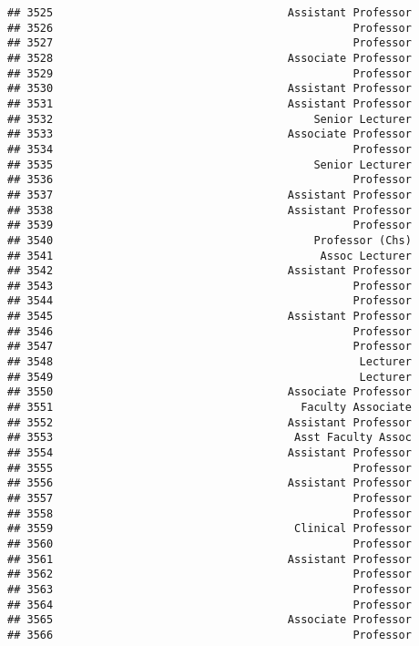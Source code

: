 \documentclass[
]{article}
\begin{document}
\begin{verbatim}
## 3525                                    Assistant Professor
## 3526                                              Professor
## 3527                                              Professor
## 3528                                    Associate Professor
## 3529                                              Professor
## 3530                                    Assistant Professor
## 3531                                    Assistant Professor
## 3532                                        Senior Lecturer
## 3533                                    Associate Professor
## 3534                                              Professor
## 3535                                        Senior Lecturer
## 3536                                              Professor
## 3537                                    Assistant Professor
## 3538                                    Assistant Professor
## 3539                                              Professor
## 3540                                        Professor (Chs)
## 3541                                         Assoc Lecturer
## 3542                                    Assistant Professor
## 3543                                              Professor
## 3544                                              Professor
## 3545                                    Assistant Professor
## 3546                                              Professor
## 3547                                              Professor
## 3548                                               Lecturer
## 3549                                               Lecturer
## 3550                                    Associate Professor
## 3551                                      Faculty Associate
## 3552                                    Assistant Professor
## 3553                                     Asst Faculty Assoc
## 3554                                    Assistant Professor
## 3555                                              Professor
## 3556                                    Assistant Professor
## 3557                                              Professor
## 3558                                              Professor
## 3559                                     Clinical Professor
## 3560                                              Professor
## 3561                                    Assistant Professor
## 3562                                              Professor
## 3563                                              Professor
## 3564                                              Professor
## 3565                                    Associate Professor
## 3566                                              Professor

\end{verbatim}
\end{document}
